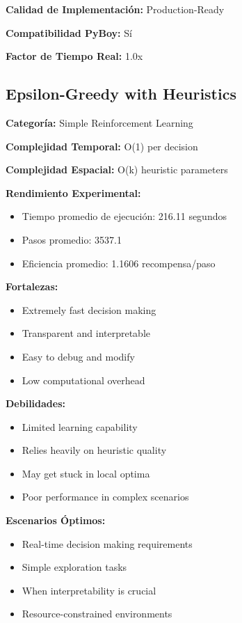 \textbf{Calidad de Implementación:} Production-Ready

\textbf{Compatibilidad PyBoy:} Sí

\textbf{Factor de Tiempo Real:} 1.0x



\subsection{Epsilon-Greedy with Heuristics}

\textbf{Categoría:} Simple Reinforcement Learning

\textbf{Complejidad Temporal:} O(1) per decision

\textbf{Complejidad Espacial:} O(k) heuristic parameters

\textbf{Rendimiento Experimental:}
\begin{itemize}
    \item Tiempo promedio de ejecución: 216.11 segundos
    \item Pasos promedio: 3537.1
    \item Eficiencia promedio: 1.1606 recompensa/paso
\end{itemize}

\textbf{Fortalezas:}
\begin{itemize}
    \item Extremely fast decision making
    \item Transparent and interpretable
    \item Easy to debug and modify
    \item Low computational overhead
\end{itemize}

\textbf{Debilidades:}
\begin{itemize}
    \item Limited learning capability
    \item Relies heavily on heuristic quality
    \item May get stuck in local optima
    \item Poor performance in complex scenarios
\end{itemize}

\textbf{Escenarios Óptimos:}
\begin{itemize}
    \item Real-time decision making requirements
    \item Simple exploration tasks
    \item When interpretability is crucial
    \item Resource-constrained environments
\end{itemize}

